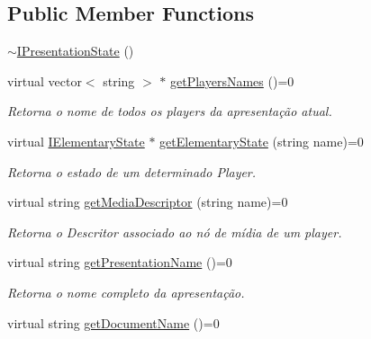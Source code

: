 \subsection*{Public Member Functions}
\begin{DoxyCompactItemize}
\item 
\hyperlink{classbr_1_1ufscar_1_1lince_1_1ginga_1_1wac_1_1state_1_1IPresentationState_a4e3e2eac0d45ddcf17526115f9a7ef84}{$\sim$IPresentationState} ()
\item 
virtual vector$<$ string $>$ $\ast$ \hyperlink{classbr_1_1ufscar_1_1lince_1_1ginga_1_1wac_1_1state_1_1IPresentationState_ac3ba6e82191af041b1bc4320ddaf0ca5}{getPlayersNames} ()=0
\begin{DoxyCompactList}\small\item\em Retorna o nome de todos os players da apresentação atual. \item\end{DoxyCompactList}\item 
virtual \hyperlink{classbr_1_1ufscar_1_1lince_1_1ginga_1_1wac_1_1state_1_1IElementaryState}{IElementaryState} $\ast$ \hyperlink{classbr_1_1ufscar_1_1lince_1_1ginga_1_1wac_1_1state_1_1IPresentationState_a42e36ac35404e13df2b3df4f2da614a1}{getElementaryState} (string name)=0
\begin{DoxyCompactList}\small\item\em Retorna o estado de um determinado Player. \item\end{DoxyCompactList}\item 
virtual string \hyperlink{classbr_1_1ufscar_1_1lince_1_1ginga_1_1wac_1_1state_1_1IPresentationState_a4a8d2526ea16319ea1efc19928ffe028}{getMediaDescriptor} (string name)=0
\begin{DoxyCompactList}\small\item\em Retorna o Descritor associado ao nó de mídia de um player. \item\end{DoxyCompactList}\item 
virtual string \hyperlink{classbr_1_1ufscar_1_1lince_1_1ginga_1_1wac_1_1state_1_1IPresentationState_a939e322cd15e49680f227bfc6b9ded9d}{getPresentationName} ()=0
\begin{DoxyCompactList}\small\item\em Retorna o nome completo da apresentação. \item\end{DoxyCompactList}\item 
virtual string \hyperlink{classbr_1_1ufscar_1_1lince_1_1ginga_1_1wac_1_1state_1_1IPresentationState_a20c06c68a1db0160932abf7d6aa4967c}{getDocumentName} ()=0

\end{DoxyCompactItemize}
